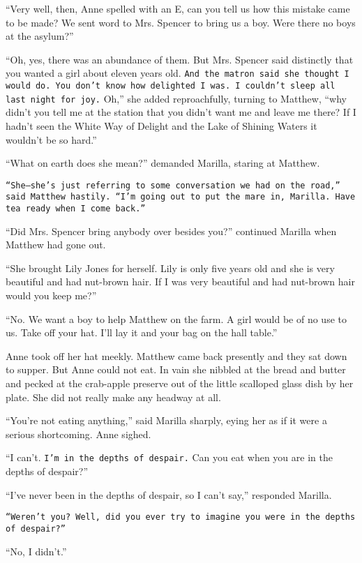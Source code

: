 \documentclass[a4paper]{article}
\begin{document}
``Very well, then, Anne spelled with an E, can you tell us how this mistake came to be made? We sent word to Mrs. Spencer to bring us a boy. Were there no boys at the asylum?''

``Oh, yes, there was an abundance of them. But Mrs. Spencer said distinctly that you wanted a girl about eleven years old. \texttt{And the matron said she thought I would do. You don't know how delighted I was. I couldn't sleep all last night for joy.} Oh,'' she added reproachfully, turning to Matthew, ``why didn't you tell me at the station that you didn't want me and leave me there? If I hadn't seen the White Way of Delight and the Lake of Shining Waters it wouldn't be so hard.''

``What on earth does she mean?'' demanded Marilla, staring at Matthew.

\texttt{``She---she's just referring to some conversation we had on the road,'' said Matthew hastily. ``I'm going out to put the mare in, Marilla. Have tea ready when I come back.''}

``Did Mrs. Spencer bring anybody over besides you?'' continued Marilla when Matthew had gone out.

\rmfamily``She brought Lily Jones for herself. \textsf{Lily is only five years old and she is very beautiful and had nut-brown hair.} If I was very beautiful and had nut-brown hair would you keep me?''

``No. We want a boy to help Matthew on the farm. A girl would be of no use to us. Take off your hat. I'll lay it and your bag on the hall table.''

\textsf{Anne took off her hat meekly. Matthew came back presently and they sat down to supper. But Anne could not eat. In vain she nibbled at the bread and butter and pecked at the crab-apple preserve out of the little scalloped glass dish by her plate. She did not really make any headway at all.}

``You're not eating anything,'' said Marilla sharply, eying her as if it were a serious shortcoming. Anne sighed.

``I can't. \texttt{I'm in the depths of despair.} Can you eat when you are in the depths of despair?''

``I've never been in the depths of despair, so I can't say,'' responded Marilla.

\texttt{``Weren't you? Well, did you ever try to imagine you were in the depths of despair?''}

``No, I didn't.''
\end{document}
